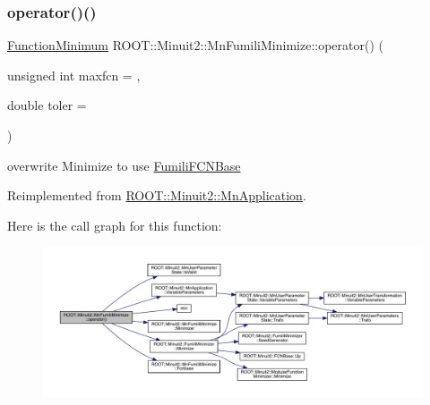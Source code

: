 \subsubsection{\texorpdfstring{operator()()}{operator()()}\hspace{0.1cm}{\footnotesize\ttfamily [1/2]}}
{\footnotesize\ttfamily \mbox{\hyperlink{classROOT_1_1Minuit2_1_1FunctionMinimum}{Function\+Minimum}} R\+O\+O\+T\+::\+Minuit2\+::\+Mn\+Fumili\+Minimize\+::operator() (\begin{DoxyParamCaption}\item[{unsigned int}]{maxfcn = {},  }\item[{double}]{toler = {} }\end{DoxyParamCaption})\hspace{0.3cm}{\ttfamily [virtual]}}



overwrite Minimize to use \mbox{\hyperlink{classROOT_1_1Minuit2_1_1FumiliFCNBase}{Fumili\+F\+C\+N\+Base}} 



Reimplemented from \mbox{\hyperlink{classROOT_1_1Minuit2_1_1MnApplication_a8908d50d5d4f7f011b94bd10e51eacf7}{R\+O\+O\+T\+::\+Minuit2\+::\+Mn\+Application}}.

Here is the call graph for this function\+:\nopagebreak
\begin{figure}[H]
\begin{center}
\leavevmode
\includegraphics[width=350pt]{dc/d88/classROOT_1_1Minuit2_1_1MnFumiliMinimize_a408e4cc7d16335d7a9bfbb8765acec6d_cgraph}
\end{center}
\end{figure}
\mbox{\label{classROOT_1_1Minuit2_1_1MnFumiliMinimize_a58da42cb9def0b42c424a3121987e77b}} 
